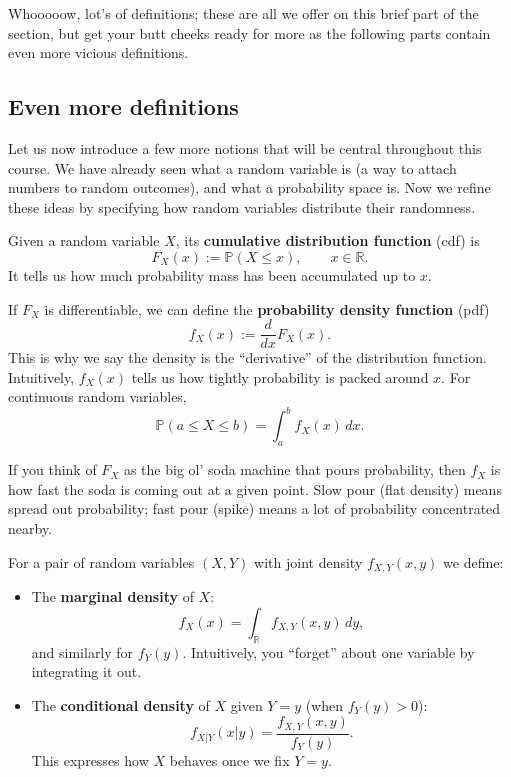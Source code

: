 \vspace{0.2cm}

Whooooow, lot's of definitions; these are all we offer on this brief part of the section, but get your butt cheeks ready for more as the following parts contain even more vicious definitions.

\subsection{Even more definitions}

Let us now introduce a few more notions that will be central throughout this course. 
We have already seen what a random variable is (a way to attach numbers to random outcomes), 
and what a probability space is. Now we refine these ideas by specifying how random variables distribute their randomness.

\begin{definition}
Given a random variable $X$, its \textbf{cumulative distribution function} (cdf) is
\[
F_X(x) := \mathbb{P}(X \leq x), \qquad x \in \mathbb{R}.
\]
It tells us how much probability mass has been accumulated up to $x$. 

If $F_X$ is differentiable, we can define the \textbf{probability density function} (pdf)
\[
f_X(x) := \frac{d}{dx} F_X(x).
\]
This is why we say the density is the ``derivative'' of the distribution function. 
Intuitively, $f_X(x)$ tells us how tightly probability is packed around $x$. For continuous random variables,
\[
\mathbb{P}(a \leq X \leq b) = \int_a^b f_X(x)\, dx.
\]
\end{definition}

If you think of $F_X$ as the big ol’ soda machine that pours probability, then 
$f_X$ is how fast the soda is coming out at a given point. Slow pour (flat density) means spread out 
probability; fast pour (spike) means a lot of probability concentrated nearby.

\begin{definition}
For a pair of random variables $(X,Y)$ with joint density $f_{X,Y}(x,y)$ we define:
\begin{itemize}
\item The \textbf{marginal density} of $X$:
\[
f_X(x) = \int_{\mathbb{R}} f_{X,Y}(x,y)\, dy,
\]
and similarly for $f_Y(y)$. Intuitively, you ``forget'' about one variable by integrating it out.

\item The \textbf{conditional density} of $X$ given $Y=y$ (when $f_Y(y) > 0$):
\[
f_{X|Y}(x|y) = \frac{f_{X,Y}(x,y)}{f_Y(y)}.
\]
This expresses how $X$ behaves once we fix $Y=y$.
\end{itemize}
\end{definition}

